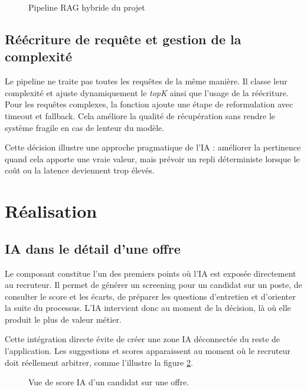 \begin{figure}[H]
  \centering
  \caption{\label{fig:rag-pipeline}Pipeline RAG hybride du projet}
\end{figure}

\subsection{Réécriture de requête et gestion de la complexité}
Le pipeline ne traite pas toutes les requêtes de la même manière. Il classe leur complexité et ajuste dynamiquement le \textit{topK} ainsi que l'usage de la réécriture. Pour les requêtes complexes, la fonction  ajoute une étape de reformulation avec timeout et fallback. Cela améliore la qualité de récupération sans rendre le système fragile en cas de lenteur du modèle.

Cette décision illustre une approche pragmatique de l'IA : améliorer la pertinence quand cela apporte une vraie valeur, mais prévoir un repli déterministe lorsque le coût ou la latence deviennent trop élevés.

\section{Réalisation}

\subsection{IA dans le détail d'une offre}
Le composant  constitue l'un des premiers points où l'IA est exposée directement au recruteur. Il permet de générer un screening pour un candidat sur un poste, de consulter le score et les écarts, de préparer les questions d'entretien et d'orienter la suite du processus. L'IA intervient donc au moment de la décision, là où elle produit le plus de valeur métier.

Cette intégration directe évite de créer une zone IA déconnectée du reste de l'application. Les suggestions et scores apparaissent au moment où le recruteur doit réellement arbitrer, comme l'illustre la figure \ref{fig:ai-score-view}.

\begin{figure}[H]
  \centering
  \caption{\label{fig:ai-score-view}Vue de score IA d'un candidat sur une offre.}
\end{figure}

